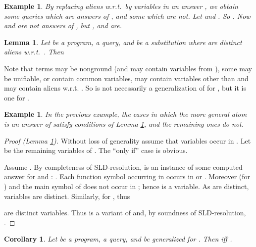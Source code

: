 \documentclass[a4paper]{tlp2}
\newtheorem{corollary}[theorem]{Corollary}
\newtheorem{lemma}[theorem]{Lemma}
\newtheorem{example}[theorem]{Example}
\begin{document}
\begin{example}
By replacing aliens w.r.t.\  by variables in an answer , 
we obtain some queries which are answers of ,
and some which are not.
Let  and .
So .
Now  and  are not answers of , 
but ,   and   are.
\end{example}



\begin{lemma}
\label{lemma:alien:substitution}  
Let  be a program,  a query, and
  be a substitution where
  are distinct aliens w.r.t.\ .  Then

\end{lemma}



Note that terms  may be nonground 
(and may contain variables from ), some
 may be unifiable, or contain common variables,
 may contain variables other than 
and may contain aliens w.r.t. .
So  is not necessarily a generalization of  for ,
but it is one for .


\begin{example}
In the previous example, the cases in which the more general atom is an
answer of  satisfy conditions of Lemma \ref{lemma:alien:substitution},
and the remaining ones do not.

\end{example}

\begin{proof}[Proof (Lemma \ref{lemma:alien:substitution})]


Without loss of generality assume that variables  occur in .
Let   be the remaining variables of .
The ``only if'' case is obvious.

Assume .  
By completeness of SLD-resolution,
 is an instance of some computed answer  for  and :
.
Each function symbol occurring in  occurs in  or .
Moreover (for ) 
and the main symbol of  does not occur in ;
hence  is a variable.
As  are distinct, variables  are
distinct. 
  Similarly,   for , thus
 
  are distinct variables.
Thus  is a variant of  and, by soundness of
  SLD-resolution, .
\end{proof}





\begin{corollary}
\label{th:generalized}
\label{cor:generalized}
Let  be a program,  a query, and  be  generalized for .
Then  iff  .
\end{corollary}
\end{document}
